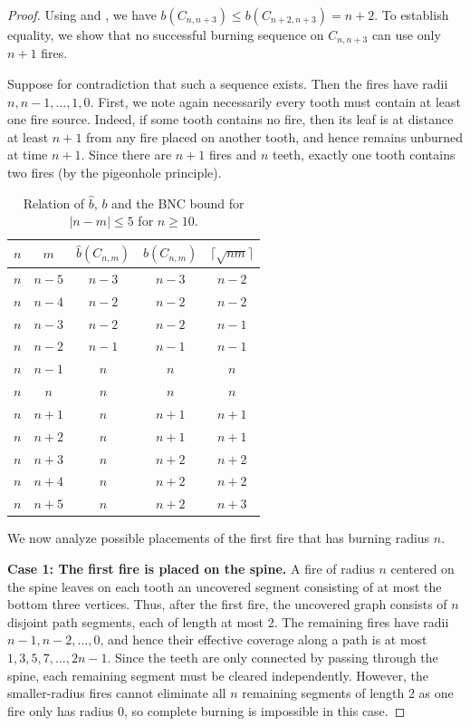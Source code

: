 \documentclass{article}
\begin{document}
\begin{proof}
Using  and , we have $b(C_{n,n+3}) \le b(C_{n+2,n+3}) = n+2$. To establish equality, we show that no successful burning sequence on $C_{n,n+3}$ can use only $n+1$ fires. 

Suppose for contradiction that such a sequence exists. Then the fires have radii $n,n-1,\ldots,1,0$. First, we note again necessarily every tooth must contain at least one fire source. Indeed, if some tooth contains no fire, then its leaf is at distance at least $n+1$ from any fire placed on another tooth, and hence remains unburned at time $n+1$. Since there are $n+1$ fires and $n$ teeth, exactly one tooth contains two fires (by the pigeonhole principle). 


\begin{table}[t]
    \centering
    \begin{tabular}{|cc|ccc|}
        $n$ & $m$ & $\hat b(C_{n,m})$ & $b(C_{n,m})$ & $\lceil \sqrt{nm} \rceil$   \\ \hline
         $n$ & $n-5$ & $n-3$ & \cellcolor{gray!15}$n-3$ & \cellcolor{gray!15}$n-2$  \\
         $n$ & $n-4$ & $n-2$ & $n-2$ & $n-2$  \\
         $n$ & $n-3$ & $n-2$ & \cellcolor{gray!15}$n-2$ & \cellcolor{gray!15}$n-1$ \\
         $n$ & $n-2$ & $n-1$ & $n-1$ & $n-1$  \\
         $n$ & $n-1$ & $n$ & $n$ & $n$ \\
         $n$ & $n$ & $n$ & $n$ & $n$  \\
         $n$ & $n+1$ & $n$ & $n+1$ & $n+1$  \\
         $n$ & $n+2$ & $n$ & $n+1$ & $n+1$  \\
         $n$ & $n+3$ & $n$ & $n+2$ & $n+2$  \\
         $n$ & $n+4$ & $n$ & $n+2$ & $n+2$  \\
         $n$ & $n+5$ & $n$ & \cellcolor{gray!15}$n+2$ & \cellcolor{gray!15}$n+3$ 
    \end{tabular}
    \caption{Relation of $\hat b$, $b$ and the BNC bound for $|n-m| \le 5$ for $n \ge 10$.}
    \label{tab:small diff}
\end{table}

We now analyze possible placements of the first fire that has burning radius $n$.

\medskip
\noindent\textbf{Case 1: The first fire is placed on the spine.}  A fire of radius $n$ centered on the spine leaves on each tooth an uncovered segment consisting of at most the bottom three vertices. Thus, after the first fire, the uncovered graph consists of $n$ disjoint path segments, each of length at most 2. The remaining fires have radii $n-1,n-2,\ldots,0$, and hence their effective coverage along a path is at most $1,3,5,7,\ldots,2n-1$. Since the teeth are only connected by passing through the spine, each remaining segment must be cleared independently. However, the smaller-radius fires cannot eliminate all $n$ remaining segments of length 2 as one fire only has radius 0, so complete burning is impossible in this case.


\end{proof}
\end{document}
